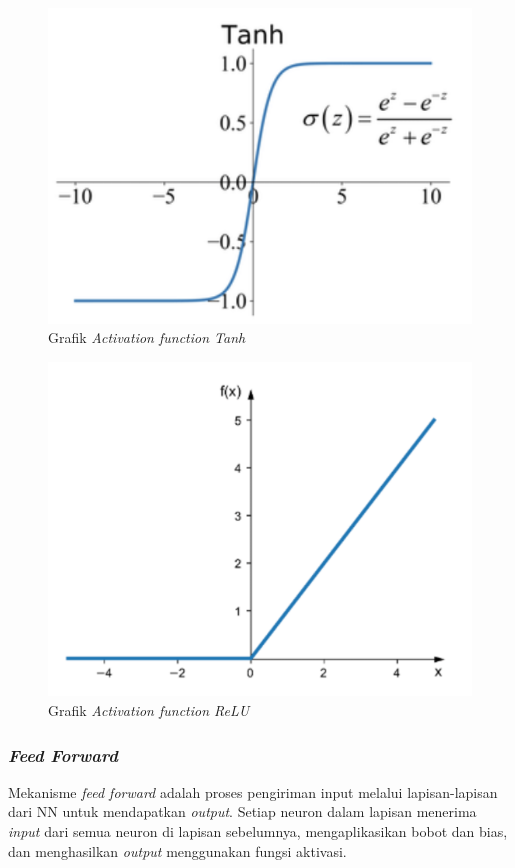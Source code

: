   \begin{figure}[htbp]
    \centering
    \includegraphics[scale=1]{gambar/bab2-grafik-tanh.png}
    \caption{Grafik \emph{Activation function Tanh}}
    \label{fig:tanh_function}
  \end{figure}

  \begin{figure}[htbp]
    \centering
    \includegraphics[scale=0.5]{gambar/bab2-grafik-relu.png}
    \caption{Grafik \emph{Activation function ReLU}}
    \label{fig:relu_function}
  \end{figure}
 
 \subsubsection{\emph{Feed Forward}}
 Mekanisme \emph{feed forward} adalah proses pengiriman input melalui lapisan-lapisan dari NN untuk mendapatkan \emph{output}. Setiap neuron dalam lapisan menerima \emph{input} dari semua neuron di lapisan sebelumnya, mengaplikasikan bobot dan bias, dan menghasilkan \emph{output} menggunakan fungsi aktivasi.
 
